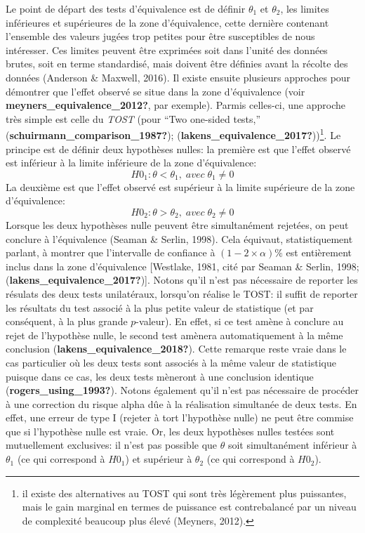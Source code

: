 \documentclass[
  english,
  man]{apa6}
\begin{document}
Le point de départ des tests d'équivalence est de définir \(\theta_1\) et \(\theta_2\), les limites inférieures et supérieures de la zone d'équivalence, cette dernière contenant l'ensemble des valeurs jugées trop petites pour être susceptibles de nous intéresser. Ces limites peuvent être exprimées soit dans l'unité des données brutes, soit en terme standardisé, mais doivent être définies avant la récolte des données (Anderson \& Maxwell, 2016). Il existe ensuite plusieurs approches pour démontrer que l'effet observé se situe dans la zone d'équivalence (voir \textbf{meyners\_equivalence\_2012?}, par exemple). Parmis celles-ci, une approche très simple est celle du \emph{TOST} (pour ``Two one-sided tests,'' (\textbf{schuirmann\_comparison\_1987?}); (\textbf{lakens\_equivalence\_2017?}))\footnote{il existe des alternatives au TOST qui sont très légèrement plus puissantes, mais le gain marginal en termes de puissance est contrebalancé par un niveau de complexité beaucoup plus élevé (Meyners, 2012).}. Le principe est de définir deux hypothèses nulles: la première est que l'effet observé est inférieur à la limite inférieure de la zone d'équivalence: \[H0_1: \theta < \theta_1, \; avec \; \theta_1 \neq 0\] La deuxième est que l'effet observé est supérieur à la limite supérieure de la zone d'équivalence: \[H0_2: \theta > \theta_2, \; avec \; \theta_2 \neq 0\] Lorsque les deux hypothèses nulle peuvent être simultanément rejetées, on peut conclure à l'équivalence (Seaman \& Serlin, 1998). Cela équivaut, statistiquement parlant, à montrer que l'intervalle de confiance à \((1-2\times\alpha)\%\) est entièrement inclus dans la zone d'équivalence {[}Westlake, 1981, cité par Seaman \& Serlin, 1998;
(\textbf{lakens\_equivalence\_2017?}){]}. Notons qu'il n'est pas nécessaire de reporter les résulats des deux tests unilatéraux, lorsqu'on réalise le TOST: il suffit de reporter les résultats du test associé à la plus petite valeur de statistique (et par conséquent, à la plus grande \(p\)-valeur). En effet, si ce test amène à conclure au rejet de l'hypothèse nulle, le second test amènera automatiquement à la même conclusion (\textbf{lakens\_equivalence\_2018?}). Cette remarque reste vraie dans le cas particulier où les deux tests sont associés à la même valeur de statistique puisque dans ce cas, les deux tests mèneront à une conclusion identique (\textbf{rogers\_using\_1993?}). Notons également qu'il n'est pas nécessaire de procéder à une correction du risque alpha dûe à la réalisation simultanée de deux tests. En effet, une erreur de type I (rejeter à tort l'hypothèse nulle) ne peut être commise que si l'hypothèse nulle est vraie. Or, les deux hypothèses nulles testées sont mutuellement exclusives: il n'est pas possible que \(\theta\) soit simultanément inférieur à \(\theta_1\) (ce qui correspond à \(H0_1\)) et supérieur à \(\theta_2\) (ce qui correspond à \(H0_2\)).
\end{document}
